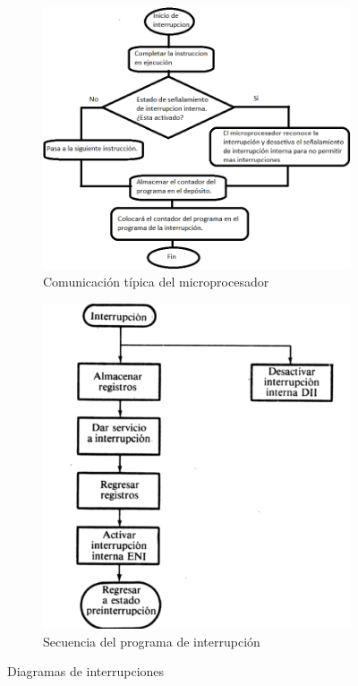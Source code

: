 \documentclass[12pt, letter]{article}
\begin{document}
\begin{figure}[h!] %
    \raggedright
        \begin{subfigure}[b]{0.45\linewidth}
            \includegraphics[width=\linewidth]{Figuras/diagrama1.png}
            \caption{Comunicación típica del microprocesador}
            \label{fig:diagrama1}
        \end{subfigure}
    \raggedleft
        \begin{subfigure}[b]{0.45\linewidth}
            \includegraphics[width=\linewidth]{Figuras/diagrama2.png}
            \caption{Secuencia del programa de interrupción}
            \label{fig:diagrama2}
        \end{subfigure}
    \caption{Diagramas de interrupciones}
    \label{fig:Diagramas}
\end{figure}
\end{document}
